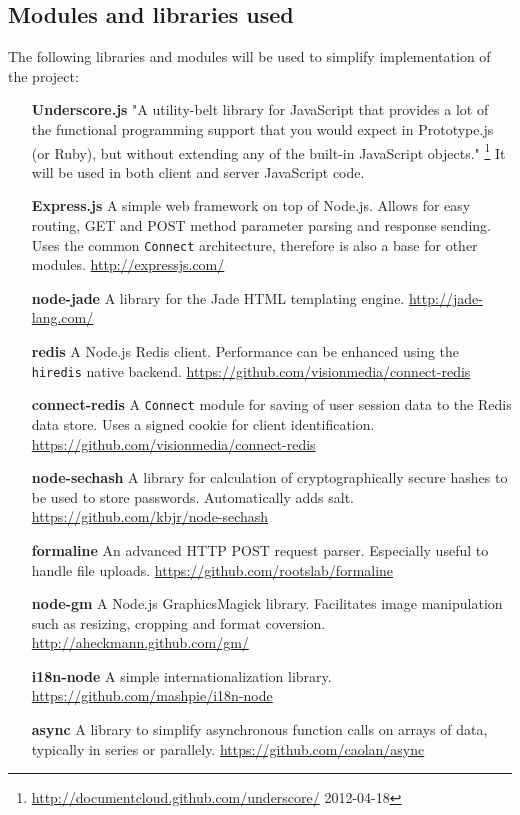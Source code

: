 \documentclass[12pt,oneside]{fithesis}
\begin{document}
	\subsection{Modules and libraries used}
		The following libraries and modules will be used to simplify implementation of the project:
		\begin{itemize}
			\item[\textbf{Underscore.js}] "A utility-belt library for JavaScript that provides a lot of the functional programming support that you would expect in Prototype.js (or Ruby), but without extending any of the built-in JavaScript objects." \footnote{\url{http://documentcloud.github.com/underscore/} 2012-04-18} It will be used in both client and server JavaScript code. 
			\item[\textbf{Express.js}] A simple web framework on top of Node.js. Allows for easy routing, GET and POST method parameter parsing and response sending. Uses the common \texttt{Connect} architecture, therefore  is also a base for other modules.  \url{http://expressjs.com/}
			\item[\textbf{node-jade}] A library for the Jade HTML templating engine. \url{http://jade-lang.com/}
			\item[\textbf{redis}] A Node.js Redis client. Performance can be enhanced using the \texttt{hiredis} native backend. \url{https://github.com/visionmedia/connect-redis}
			\item[\textbf{connect-redis}] A \texttt{Connect} module for saving of user session data to the Redis data store. Uses a signed cookie for client identification. \url{https://github.com/visionmedia/connect-redis}
			\item[\textbf{node-sechash}] A library for calculation of cryptographically secure hashes to be used to store passwords. Automatically adds salt. \url{https://github.com/kbjr/node-sechash}
			\item[\textbf{formaline}] An advanced HTTP POST request parser. Especially useful to handle file uploads. \url{https://github.com/rootslab/formaline}
			\item[\textbf{node-gm}] A Node.js GraphicsMagick library. Facilitates image manipulation such as resizing, cropping and format coversion. \url{http://aheckmann.github.com/gm/}
			\item[\textbf{i18n-node}] A simple internationalization library. \url{https://github.com/mashpie/i18n-node}
			\item[\textbf{async}] A library to simplify asynchronous function calls on arrays of data, typically in series or parallely. \url{https://github.com/caolan/async}

\end{itemize}
\end{document}
